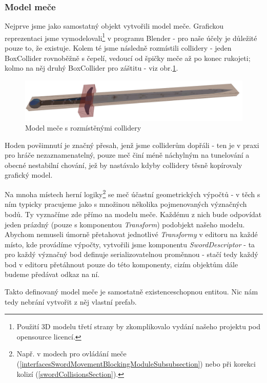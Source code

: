 \subsubsection*{Model meče}

Nejprve jsme jako samostatný objekt vytvořili model meče. Grafickou reprezentaci jsme vymodelovali\footnote{Použití 3D modelu třetí strany by zkomplikovalo vydání našeho projektu pod opensource licencí.} v programu Blender \cite{Blender} - pro naše účely je důležité pouze to, že existuje. Kolem té jsme následně rozmístili collidery - jeden BoxCollider rovnoběžně s čepelí, vedoucí od špičky meče až po konec rukojeti; kolmo na něj druhý BoxCollider pro záštitu - viz obr.\ref{obr05:swordWithColliders}. 
\begin{figure}[ht]\centering
  \center
  \includegraphics[width=120mm]{../img/swordWithColliders.png}
  \caption{Model meče s rozmístěnými collidery}
  \label{obr05:swordWithColliders}
\end{figure} 
Hoden povšimnutí je značný přesah, jenž jsme colliderům dopřáli - ten je v praxi pro hráče nezaznamenatelný, pouze meč činí méně náchylným na tunelování a obecné nestabilní chování, jež by nastávalo kdyby collidery těsně kopírovaly grafický model.  

Na mnoha místech herní logiky\footnote{Např. v modech pro ovládání meče (\ref{interfacesSwordMovementBlockingModuleSubsubsection}) nebo při korekci kolizí (\ref{swordCollisionsSection}).} se meč účastní geometrických výpočtů - v těch s ním typicky pracujeme jako s množinou několika pojmenovaných význačných bodů. Ty vyznačíme zde přímo na modelu meče. Každému z nich bude odpovídat jeden prázdný (pouze s komponentou \textit{Transform}) podobjekt našeho modelu. Abychom nemuseli úmorně přetahovat jednotlivé \textit{Transformy} v editoru na každé místo, kde provádíme výpočty, vytvořili jsme komponentu \textit{SwordDescriptor} - ta pro každý význačný bod definuje serializovatelnou proměnnou - stačí tedy každý bod v editoru přetáhnout pouze do této komponenty, cizím objektům dále budeme předávat odkaz na ní.

\bigbreak

Takto definovaný model meče je samostatně existenceschopnou entitou. Nic nám tedy nebrání vytvořit z něj vlastní prefab.

